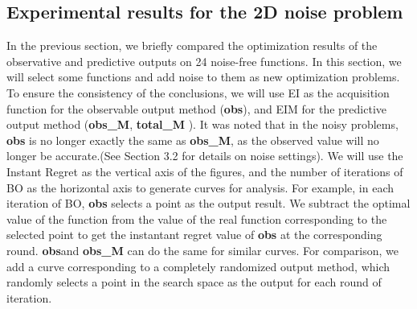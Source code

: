 \documentclass{article}
\begin{document}
  \subsection{Experimental results for the 2D noise problem}
  \hspace{2em}In the previous section, we briefly compared the optimization results of the observative and predictive outputs on 24 noise-free functions. In this section, we will select some functions and add noise to them as new optimization problems. To ensure the consistency of the conclusions, we will use EI as the acquisition function for the observable output method (\textbf{obs}), and EIM for the predictive output method (\textbf{obs\_M}, \textbf{total\_M} ). It was noted that in the noisy problems, \textbf{obs} is no longer exactly the same as \textbf{obs\_M}, as the observed value will no longer be accurate.(See Section 3.2 for details on noise settings). We will use the Instant Regret as the vertical axis of the figures, and the number of iterations of BO as the horizontal axis to generate curves for analysis. For example, in each iteration of BO, \textbf{obs} selects a point as the output result. We subtract the optimal value of the function from the value of the real function corresponding to the selected point to get the instantant regret value of \textbf{obs} at the corresponding round. \textbf{obs}and \textbf{obs\_M} can do the same for similar curves. For comparison, we add a curve corresponding to a completely randomized output method, which randomly selects a point in the search space as the output for each round of iteration.
  
\end{document}
